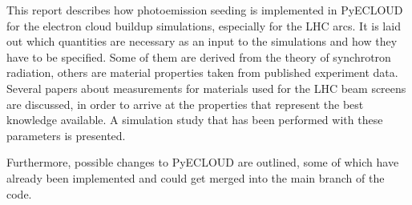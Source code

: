
This report describes how photoemission seeding is implemented in PyECLOUD for the electron cloud buildup simulations, especially for the LHC arcs.
It is laid out which quantities are necessary as an input to the simulations and how they have to be specified.
Some of them are derived from the theory of synchrotron radiation, others are material properties taken from published experiment data.
Several papers about measurements for materials used for the LHC beam screens are discussed, in order to arrive at the properties that represent the best knowledge available.
A simulation study that has been performed with these parameters is presented.

Furthermore, possible changes to PyECLOUD are outlined, some of which have already been implemented and could get merged into the main branch of the code.

